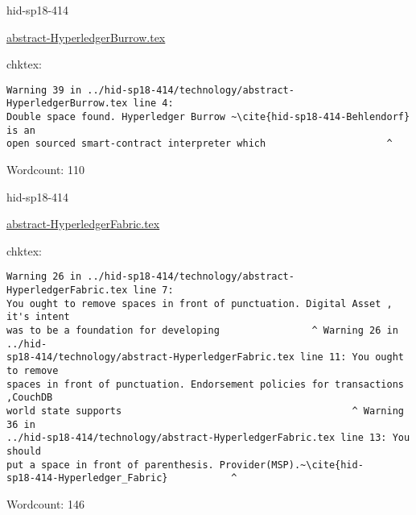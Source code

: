 

\begin{IU}

hid-sp18-414

\href{https://github.com/cloudmesh-community/hid-sp18-414/blob/master//technology/abstract-HyperledgerBurrow.tex}{abstract-HyperledgerBurrow.tex}

 
chktex:
\begin{tiny}
\begin{verbatim}
Warning 39 in ../hid-sp18-414/technology/abstract-HyperledgerBurrow.tex line 4:
Double space found. Hyperledger Burrow ~\cite{hid-sp18-414-Behlendorf} is an
open sourced smart-contract interpreter which                     ^
\end{verbatim}
\end{tiny}

Wordcount: 110

\end{IU}



\begin{IU}

hid-sp18-414

\href{https://github.com/cloudmesh-community/hid-sp18-414/blob/master//technology/abstract-HyperledgerFabric.tex}{abstract-HyperledgerFabric.tex}

 
chktex:
\begin{tiny}
\begin{verbatim}
Warning 26 in ../hid-sp18-414/technology/abstract-HyperledgerFabric.tex line 7:
You ought to remove spaces in front of punctuation. Digital Asset , it's intent
was to be a foundation for developing                ^ Warning 26 in ../hid-
sp18-414/technology/abstract-HyperledgerFabric.tex line 11: You ought to remove
spaces in front of punctuation. Endorsement policies for transactions ,CouchDB
world state supports                                        ^ Warning 36 in
../hid-sp18-414/technology/abstract-HyperledgerFabric.tex line 13: You should
put a space in front of parenthesis. Provider(MSP).~\cite{hid-
sp18-414-Hyperledger_Fabric}           ^
\end{verbatim}
\end{tiny}

Wordcount: 146

\end{IU}



